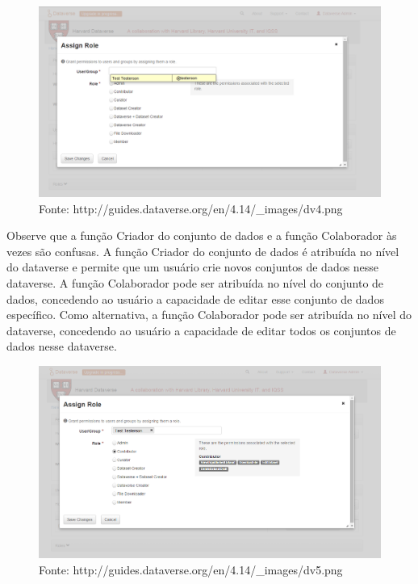 \documentclass[12pt,hidelinks]{article}
\begin{document}
\begin{figure}[H]
                \centering
                \includegraphics[scale=0.4]{prt4.png}
                \caption{Fonte: http://guides.dataverse.org/en/4.14/\_images/dv4.png}
            \label{Acesso 2}
        \end{figure}
        
Observe que a função Criador do conjunto de dados e a função Colaborador às vezes são confusas. A função Criador do conjunto de dados é atribuída no nível do dataverse e permite que um usuário crie novos conjuntos de dados nesse dataverse. A função Colaborador pode ser atribuída no nível do conjunto de dados, concedendo ao usuário a capacidade de editar esse conjunto de dados específico. Como alternativa, a função Colaborador pode ser atribuída no nível do dataverse, concedendo ao usuário a capacidade de editar todos os conjuntos de dados nesse dataverse.

\begin{figure}[H]
                \centering
                \includegraphics[scale=0.4]{prt5.png}
                \caption{Fonte: http://guides.dataverse.org/en/4.14/\_images/dv5.png}
            \label{Acesso 3}
        \end{figure}
\end{document}
